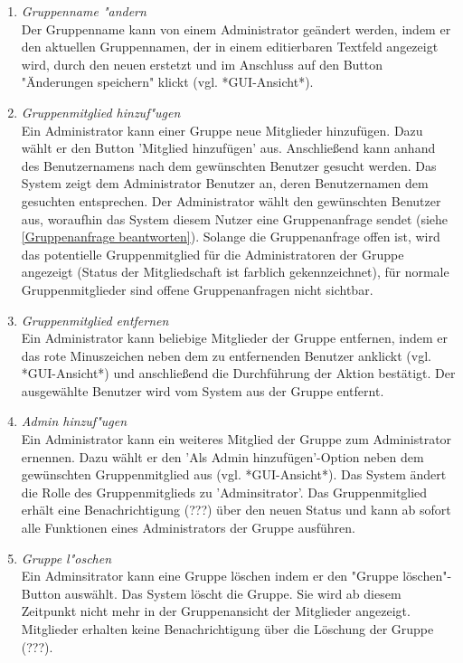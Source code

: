 \documentclass[parskip=full]{scrartcl}
\def\threedigits#1{%
  \ifnum#1<100 0\fi
  \ifnum#1<10 0\fi
  \number#1}
\begin{document}
\begin{enumerate}[label={\textbf{/F\protect\threedigits{\theenumi}0/}}, leftmargin=*, resume]

	\item \textit{Gruppenname "andern}\\
	Der Gruppenname kann von einem Administrator geändert werden, indem er den aktuellen Gruppennamen, der in einem editierbaren Textfeld angezeigt wird, durch den neuen erstetzt und im Anschluss auf den Button "Änderungen speichern" klickt (vgl. *GUI-Ansicht*).
	
	\item \textit{Gruppenmitglied hinzuf"ugen} \label{Mitglieder hinzufügen} \\
	Ein Administrator kann einer Gruppe neue Mitglieder hinzufügen. Dazu wählt er den Button 'Mitglied hinzufügen' aus. Anschließend kann anhand des \gls{Benutzername}ns nach dem gewünschten Benutzer gesucht werden. Das System zeigt dem Administrator Benutzer an, deren Benutzernamen dem gesuchten entsprechen. Der Administrator wählt den gewünschten Benutzer aus, woraufhin das System diesem Nutzer eine Gruppenanfrage sendet (siehe \ref{Gruppenanfrage beantworten}). Solange die Gruppenanfrage offen ist, wird das potentielle Gruppenmitglied für die Administratoren der Gruppe angezeigt (Status der Mitgliedschaft ist farblich gekennzeichnet), für normale Gruppenmitglieder sind offene Gruppenanfragen nicht sichtbar.
	
	\item \textit{Gruppenmitglied entfernen}\\
	Ein Administrator kann beliebige Mitglieder der Gruppe entfernen, indem er das rote Minuszeichen neben dem zu entfernenden Benutzer anklickt (vgl. *GUI-Ansicht*) und anschließend die Durchführung der Aktion bestätigt. Der ausgewählte Benutzer wird vom System aus der Gruppe entfernt.
	
	\item \textit{Admin hinzuf"ugen} \label{Admin hinzufügen} \\
	Ein Administrator kann ein weiteres Mitglied der Gruppe zum Administrator ernennen. Dazu wählt er den 'Als Admin hinzufügen'-Option neben dem gewünschten Gruppenmitglied aus (vgl. *GUI-Ansicht*). Das System ändert die Rolle des Gruppenmitglieds zu 'Adminsitrator'. Das Gruppenmitglied erhält eine Benachrichtigung (???) über den neuen Status und kann ab sofort alle Funktionen eines Administrators der Gruppe ausführen.
	
	\item \textit{Gruppe l"oschen} \\
	Ein Adminsitrator kann eine Gruppe löschen indem er den "Gruppe löschen"-Button auswählt. Das System löscht die Gruppe. Sie wird ab diesem Zeitpunkt nicht mehr in der Gruppenansicht der Mitglieder angezeigt. Mitglieder erhalten keine Benachrichtigung über die Löschung der Gruppe (???).
	
\end{enumerate}
	
\end{document}

